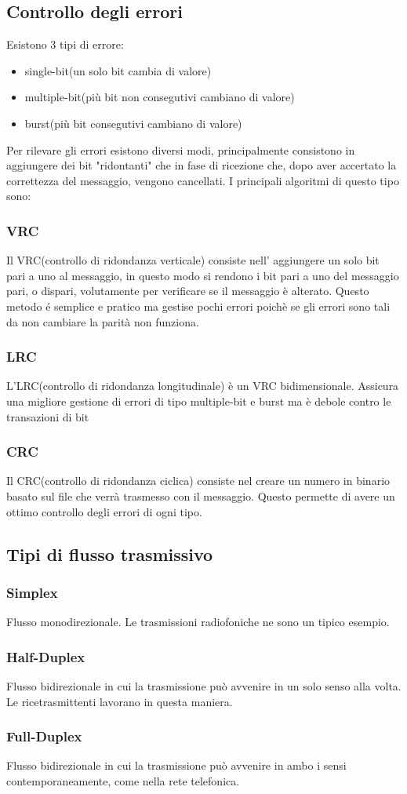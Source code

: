 \documentclass[a4paper,11pt]{article}
\def\sub#1{\subsection{#1}\label{#1}}
\def\subsub#1{\subsubsection{#1}\label{#1}}
\begin{document}
\sub{Controllo degli errori}
Esistono 3 tipi di errore:
\begin{itemize}
    \item single-bit(un solo bit cambia di valore)
    \item multiple-bit(più bit non consegutivi cambiano di valore)
    \item burst(più bit consegutivi cambiano di valore)
\end{itemize}
Per rilevare gli errori esistono diversi modi, principalmente consistono in aggiungere dei bit "ridontanti" che in fase di ricezione che, dopo aver accertato la correttezza del messaggio, vengono cancellati. I principali algoritmi di questo tipo sono:
\subsub{VRC}
Il VRC(controllo di ridondanza verticale) consiste nell' aggiungere un solo bit pari a uno al messaggio, in questo modo si rendono i bit pari a uno del messaggio pari, o dispari, volutamente per verificare se il messaggio è alterato. Questo metodo é semplice e pratico ma gestise pochi errori poichè se gli errori sono tali da non cambiare la parità non funziona.
\subsub{LRC}
L'LRC(controllo di ridondanza longitudinale) è un VRC bidimensionale.
Assicura una migliore gestione di errori di tipo multiple-bit e burst ma è debole contro le transazioni di bit
\subsub{CRC}
Il CRC(controllo di ridondanza ciclica) consiste nel creare un numero in binario basato sul file che verrà trasmesso con il messaggio. Questo permette di avere un ottimo controllo degli errori di ogni tipo.
\sub{Tipi di flusso trasmissivo}
\subsub{Simplex} Flusso monodirezionale. Le trasmissioni radiofoniche ne sono un tipico esempio. 
\subsub{Half-Duplex} Flusso bidirezionale in cui la trasmissione può avvenire in un solo senso alla volta. Le ricetrasmittenti lavorano in questa maniera. 
\subsub{Full-Duplex} Flusso bidirezionale in cui la trasmissione può avvenire in ambo i sensi contemporaneamente, come nella rete telefonica. 
\end{document}
